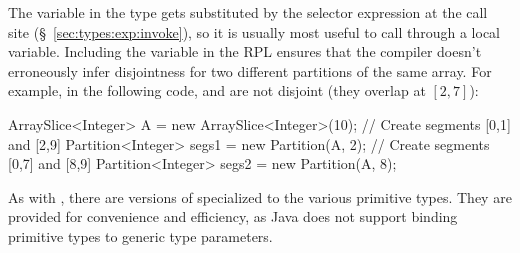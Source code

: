 The variable  in the type gets substituted by the selector
expression at the call site (\S~\ref{sec:types:exp:invoke}), so it is
usually most useful to call  through a  local
variable.  Including the variable in the RPL ensures that the compiler
doesn't erroneously infer disjointness for two different partitions of
the same array.  For example, in the following code,
 and  are not disjoint (they
overlap at $[2,7]$):
%
\begin{dpjlisting}
ArraySlice<Integer> A = new ArraySlice<Integer>(10);
// Create segments [0,1] and [2,9]
Partition<Integer> segs1 = new Partition(A, 2);
// Create segments [0,7] and [8,9]
Partition<Integer> segs2 = new Partition(A, 8);
\end{dpjlisting}

 As with ,
there are versions of  specialized to the various
primitive types.  They are provided for convenience and efficiency, as
Java does not support binding primitive types to generic type
parameters.


